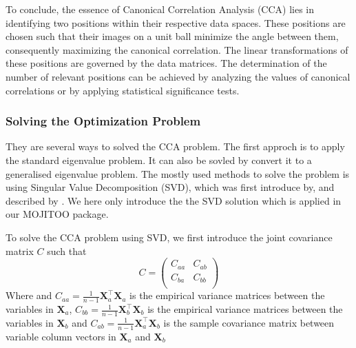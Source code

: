  To conclude, the essence of Canonical Correlation Analysis (CCA) lies in identifying two positions within their respective data spaces. These positions are chosen such that their images on a unit ball minimize the angle between them, consequently maximizing the canonical correlation. The linear transformations of these positions are governed by the data matrices. The determination of the number of relevant positions can be achieved by analyzing the values of canonical correlations or by applying statistical significance tests.

\subsubsection{Solving the Optimization Problem}
They are several ways to solved the CCA problem. The first approch is to apply the standard eigenvalue problem\citep{HOTELLING1936cca2,hooper1959ccaeigen}. It can also be sovled by convert it to a generalised eigenvalue problem\citep{bach2002kernel,hardoon2004canonical}. The mostly used methods to solve the problem is using Singular Value Decomposition (SVD), which was first introduce by\citep{healy1957ccasvd}, and described by \citep{ewerbring1989canonical}. We here only introduce the the SVD solution which is applied in our MOJITOO package.


To solve the CCA problem using SVD, we first introduce the joint covariance matrix $C$ such that
\begin{equation}
	C = \begin{pmatrix}
		C_{aa} & C_{ab}\\
		C_{ba} & C_{bb}\\
	\end{pmatrix}	
\end{equation}
Where  and $C_{aa} = \frac{1}{n-1} \mathbf{X}_a^\top \mathbf{X}_a$ is the empirical variance matrices between the variables in $\mathbf{X}_a$, $C_{bb} = \frac{1}{n-1} \mathbf{X}_b^\top \mathbf{X}_b$ is the empirical variance matrices between the variables in $\mathbf{X}_b$ and $C_{ab} = \frac{1}{n-1} \mathbf{X}_a^\top \mathbf{X}_b$ is the sample covariance matrix between variable column vectors in $\mathbf{X}_a$ and $\mathbf{X}_b$

